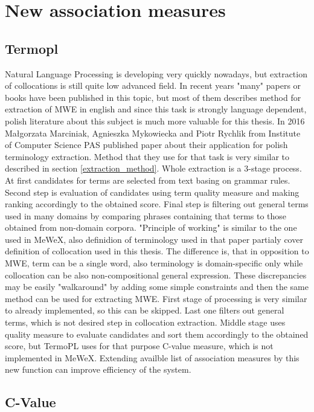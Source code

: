 \chapter{New association measures}


\section{Termopl}
Natural Language Processing is developing very quickly nowadays, but extraction of collocations is still quite low advanced field. 
In recent years "many" papers or books have been published in this topic, but most of them describes method for extraction of MWE in english 
and since this task is strongly language dependent, polish literature about this subject is much more valuable for this thesis.
In 2016 Małgorzata Marciniak, Agnieszka Mykowiecka and Piotr Rychlik from Institute of Computer Science PAS published paper about their application 
for polish terminology extraction. Method that they use for that task is very similar to described in section \ref{extraction_method}. 
Whole extraction is a 3-stage process. At first candidates for terms are selected from text basing on grammar rules. 
Second step is evaluation of candidates using term quality measure and making ranking accordingly to the obtained score. 
Final step is filtering out general terms used in many domains by comparing phrases containing that terms to those obtained from non-domain corpora.
"Principle of working" is similar to the one used in MeWeX, also definidion of terminology used in that paper 
partialy cover definition of collocation used in this thesis. The difference is, that in opposition to MWE, term can be a single word, 
also terminology is domain-specific only while collocation can be also non-compositional general expression. 
These discrepancies may be easily "walkaround" by adding some simple constraints and then the same method can be used for extracting MWE. 
First stage of processing is very similar to already implemented, so this can be skipped. Last one filters out general terms, 
which is not desired step in collocation extraction. Middle stage uses quality measure to evaluate candidates and sort them 
accordingly to the obtained score, but TermoPL uses for that purpose C-value measure, which is not implemented in MeWeX. 
Extending availble list of association measures by this new function can improve efficiency of the system.

\section{C-Value}

